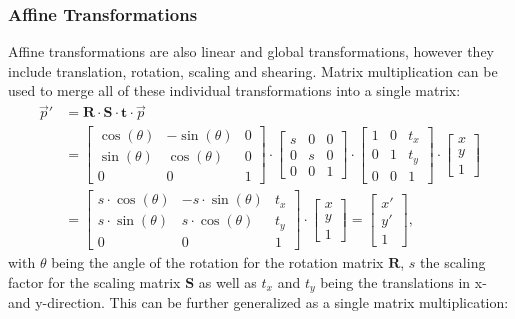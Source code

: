 \subsubsection{Affine Transformations}
Affine transformations are also linear and global transformations, however they include translation, rotation, scaling and shearing. Matrix multiplication can be used to merge all of these individual transformations into a single matrix:
\begin{align}
	\overrightarrow{p}' 	&= \mathbf{R} \cdot \mathbf{S} \cdot \mathbf{t} \cdot  \overrightarrow{p}	\\
	&= 
	\begin{bmatrix}
		\cos(\theta) & -\sin(\theta) & 0\\
		\sin(\theta) & \cos(\theta) & 0\\
		0 & 0 & 1
	\end{bmatrix}
	\cdot 
	\begin{bmatrix}
		s & 0 & 0\\
		0 & s & 0\\
		0 & 0 & 1
	\end{bmatrix}
	\cdot 
	\begin{bmatrix}
		1 & 0 & t_x\\
		0 & 1 & t_y\\
		0 & 0 & 1
	\end{bmatrix}
	\cdot
	\begin{bmatrix}
		x\\
		y\\
		1
	\end{bmatrix}
	\\
	&=
	\begin{bmatrix}
		s \cdot \cos(\theta) & -s \cdot \sin(\theta) & t_x\\
		s \cdot \sin(\theta) & s \cdot \cos(\theta) & t_y\\
		0 & 0 & 1
	\end{bmatrix}
	\cdot
	\begin{bmatrix}
		x\\
		y\\
		1
	\end{bmatrix} =
	\begin{bmatrix}
		x'\\
		y'\\
		1
	\end{bmatrix} ,
\end{align}
with $\theta$ being the angle of the rotation for the rotation matrix $\mathbf{R}$, $s$ the scaling factor for the scaling matrix $\mathbf{S}$ as well as $t_x$ and $t_y$ being the translations in x- and y-direction. This can be further generalized as a single matrix multiplication:
